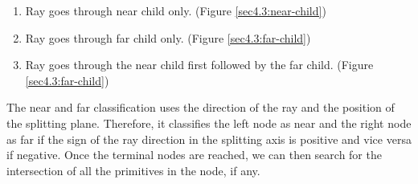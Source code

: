 \documentclass[a4paper,11pt,oneside]{article}
\begin{document}
\begin{enumerate}
	\item Ray goes through near child only. (Figure \ref{sec4.3:near-child})
	\item Ray goes through far child only. (Figure \ref{sec4.3:far-child})
	\item Ray goes through the near child first followed by the far child. (Figure \ref{sec4.3:far-child})
\end{enumerate}

The near and far classification uses the direction of the ray and the position of the splitting plane. Therefore, it classifies the left node as near and the right node as far if the sign of the ray direction in the splitting axis is positive and vice versa if negative. Once the terminal nodes are reached, we can then search for the intersection of all the primitives in the node, if any.
\end{document}
